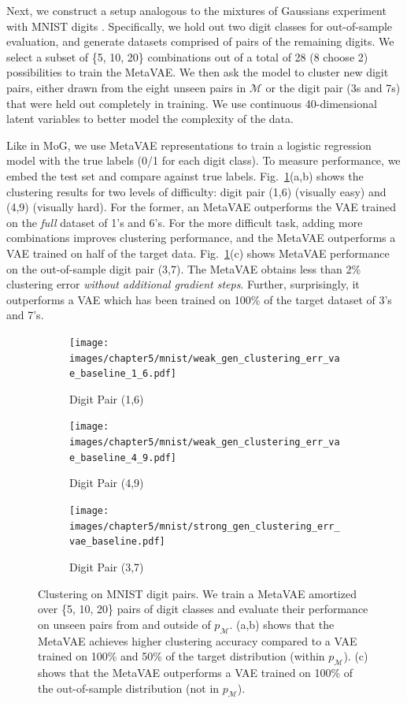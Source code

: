 Next, we construct a setup analogous to the mixtures of Gaussians experiment with MNIST digits \cite{lecun1998mnist}. Specifically, we hold out two digit classes for out-of-sample evaluation, and generate datasets comprised of pairs of the remaining digits. We select a subset of \{5, 10, 20\} combinations out of a total of 28 (8 choose 2) possibilities to train the MetaVAE. We then ask the model to cluster new digit pairs, either drawn from the eight unseen pairs in $\mathcal{M}$ or the digit pair (3s and 7s) that were held out completely in training. We use continuous 40-dimensional latent variables to better model the complexity of the data.

Like in MoG, we use MetaVAE representations to train a logistic regression model with the true labels (0/1 for each digit class). 
To measure performance, we embed the test set and compare against true labels. Fig.~\ref{fig:mnist}(a,b) shows the clustering results for two levels of difficulty: digit pair (1,6) (visually easy) and (4,9) (visually hard). For the former, an MetaVAE outperforms the VAE trained on the \textit{full} dataset of 1's and 6's. For the more difficult task, adding more combinations improves clustering performance, and the MetaVAE outperforms a VAE trained on half of the target data. Fig.~\ref{fig:mnist}(c) shows MetaVAE performance on the out-of-sample digit pair (3,7). The MetaVAE obtains less than 2\% clustering error \textit{without additional gradient steps}. Further, surprisingly, it outperforms a VAE which has been trained on 100\% of the target dataset of 3's and 7's. 
\begin{figure}
\centering
\begin{subfigure}[b]{0.32\linewidth}
    \texttt{[image: images/chapter5/mnist/weak\_gen\_clustering\_err\_vae\_baseline\_1\_6.pdf]}
    \caption{Digit Pair (1,6)}
\end{subfigure}
\begin{subfigure}[b]{0.32\linewidth}
    \texttt{[image: images/chapter5/mnist/weak\_gen\_clustering\_err\_vae\_baseline\_4\_9.pdf]}
    \caption{Digit Pair (4,9)}
\end{subfigure}
\begin{subfigure}[b]{0.32\linewidth}
    \texttt{[image: images/chapter5/mnist/strong\_gen\_clustering\_err\_vae\_baseline.pdf]}
    \caption{Digit Pair (3,7)}
\end{subfigure}
\caption{Clustering on MNIST digit pairs. We train a MetaVAE amortized over \{5, 10, 20\} pairs of digit classes and evaluate their performance on unseen pairs from and outside of  $p_\mathcal{M}$. (a,b) shows that the MetaVAE achieves higher clustering accuracy compared to a VAE trained on 100\% and 50\% of the target distribution (within $p_\mathcal{M}$). (c) shows that the MetaVAE outperforms a VAE trained on 100\% of the out-of-sample distribution (not in $p_\mathcal{M}$).}
\label{fig:mnist}
\end{figure}

